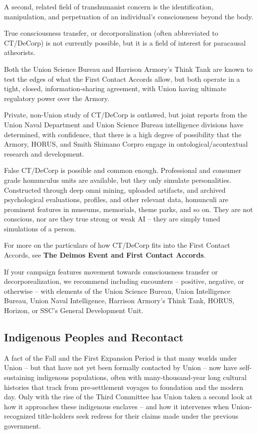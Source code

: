 A second, related field of transhumanist concern is the identification, manipulation, and
perpetuation of an individual's consciousness beyond the body.

True consciousness transfer, or decorporalization (often abbreviated to CT/DeCorp) is not
currently possible, but it is a field of interest for paracausal atheorists.

Both the Union Science Bureau and Harrison Armory's Think Tank are known to test the edges of
what the First Contact Accords allow, but both operate in a tight, closed, information-sharing
agreement, with Union having ultimate regulatory power over the Armory.

Private, non-Union study of CT/DeCorp is outlawed, but joint reports from the Union Naval
Department and Union Science Bureau intelligence divisions have determined, with confidence,
that there is a high degree of possibility that the Armory, HORUS, and Smith Shimano Corpro
engage in ontological/acontextual research and development.

False CT/DeCorp is possible and common enough. Professional and consumer grade
homunculus units are available, but they only simulate personalities. Constructed through deep
omni mining, uploaded artifacts, and archived psychological evaluations, profiles, and other
relevant data, homunculi are prominent features in museums, memorials, theme parks, and so
on. They are not conscious, nor are they true strong or weak AI -- they are simply tuned
simulations of a person.

For more on the particulars of how CT/DeCorp fits into the First Contact Accords, see \textbf{The
Deimos Event and First Contact Accords}.

If your campaign features movement towards consciousness transfer or decorporealization, we
recommend including encounters -- positive, negative, or otherwise -- with elements of the
Union Science Bureau, Union Intelligence Bureau, Union Naval Intelligence, Harrison Armory's
Think Tank, HORUS, Horizon, or SSC's General Development Unit.

\subsection{Indigenous Peoples and Recontact}

A fact of the Fall and the First Expansion Period is that many worlds under Union -- but that have
not yet been formally contacted by Union -- now have self-sustaining indigenous populations,
often with many-thousand-year long cultural histories that track from pre-settlement voyages to
foundation and the modern day. Only with the rise of the Third Committee has Union taken a
second look at how it approaches these indigenous enclaves -- and how it intervenes when
Union-recognized title-holders seek redress for their claims made under the previous
government.

